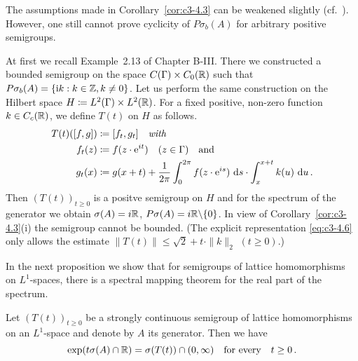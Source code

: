 The assumptions made in Corollary~\ref{cor:c3-4.3} can be weakened slightly (cf.\ \citet{greiner:1982}). 
However, one still cannot prove cyclicity of $P\sigma_{b}(A)$ for arbitrary positive semigroups.

\begin{example}\label{ex:c3-4.4}
	At first we recall Example~2.13 of Chapter B-III. 
	There we constructed a bounded semigroup on the space $C(\Gamma)\times C_{0}(\mathbb{R} )$ such that $P\sigma_{b}(A) = \{\mathrm{i} k : k \in \mathbb{Z}, k \neq 0\}$.
%
%
%
Let us perform the same construction on the Hilbert space
$H \coloneqq L^2(\Gamma)\times L^2(\mathbb{R} )$.
For a fixed positive, non-zero function $k \in C_c(\mathbb{R} )$,
we define $T(t)$ on $H$ as follows.
\begin{equation}\label{eq:c3-4.6}
	\begin{aligned} 
		T(t)([f,g]) &\coloneqq [f_t,g_t] \quad \textit{with}\\
		f_t(z) &\coloneqq f(z \cdot \mathrm{e}^{it}) \quad (z \in \Gamma) \quad \text{and}\\
		g_t(x) &\coloneqq g(x+t) + \frac{1}{2\pi}\int_{0}^{2\pi} f(z \cdot \mathrm{e}^{is}) \,\mathop{}\!\mathrm{d}{s} \cdot \int_{x}^{x+t} k(u) \,\mathop{}\!\mathrm{d}{u}\,.
	\end{aligned}
\end{equation}
Then $(T(t))_{t \geq 0}$ is a positve semigroup on $H$ and for the spectrum of
the generator we obtain $\sigma(A) = i\mathbb{R} $, $P\sigma(A) = i\mathbb{R} \backslash\{0\}$.
In view of Corollary~\ref{cor:c3-4.3}(i) the semigroup cannot be bounded.
(The explicit representation \eqref{eq:c3-4.6} only allows the estimate $\|T(t)\| \leq \sqrt{2} + t \cdot \|k\|_2$ $(t\geq 0)$.)
\end{example}

In the next proposition we show that for semigroups of lattice homomorphisms on $L^1$-spaces, there is a spectral mapping theorem for the
real part of the spectrum.

\begin{proposition}\label{prop:c3-4.5}
Let $(T(t))_{t \geq 0}$ be a strongly continuous semigroup
of lattice homomorphisms on an $L^1$-space and denote by $A$ its generator.
Then we have
\begin{equation}\label{eq:c3-4.7}
	\exp(t\sigma(A) \cap \mathbb{R} ) = \sigma(T(t)) \cap (0,\infty) \quad \text{for every} \quad t \geq 0\,.
\end{equation}
\end{proposition}


